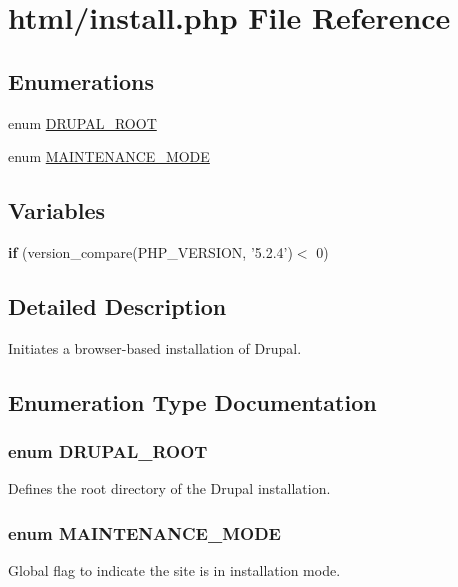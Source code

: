\hypertarget{install_8php}{
\section{html/install.php File Reference}
\label{install_8php}
}
\subsection*{Enumerations}
\begin{DoxyCompactItemize}
\item 
enum \hyperlink{install_8php_a21cf187d162beffb1fbc5a1d1098f4f9}{DRUPAL\_\-ROOT} 
\item 
enum \hyperlink{install_8php_a5bf6dfe9ba7ee16c648e3932aa76535d}{MAINTENANCE\_\-MODE} 
\end{DoxyCompactItemize}
\subsection*{Variables}
\begin{DoxyCompactItemize}
\item 
\hypertarget{install_8php_ae62e4ddf3550d41b2062002b5b8aa836}{
{\bfseries if} (version\_\-compare(PHP\_\-VERSION, '5.2.4')$<$ 0)}
\label{install_8php_ae62e4ddf3550d41b2062002b5b8aa836}

\end{DoxyCompactItemize}


\subsection{Detailed Description}
Initiates a browser-\/based installation of Drupal. 

\subsection{Enumeration Type Documentation}
\hypertarget{install_8php_a21cf187d162beffb1fbc5a1d1098f4f9}{
\subsubsection[{DRUPAL\_\-ROOT}]{\setlength{\rightskip}{0pt plus 5cm}enum {\bf DRUPAL\_\-ROOT}}}
\label{install_8php_a21cf187d162beffb1fbc5a1d1098f4f9}
Defines the root directory of the Drupal installation. \hypertarget{install_8php_a5bf6dfe9ba7ee16c648e3932aa76535d}{
\subsubsection[{MAINTENANCE\_\-MODE}]{\setlength{\rightskip}{0pt plus 5cm}enum {\bf MAINTENANCE\_\-MODE}}}
\label{install_8php_a5bf6dfe9ba7ee16c648e3932aa76535d}
Global flag to indicate the site is in installation mode. 